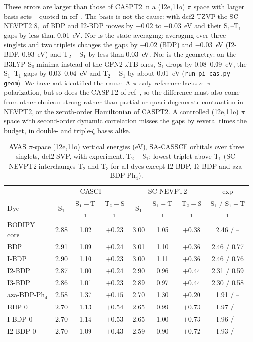 \documentclass[journal=jctcce,manuscript=article]{achemso}
\begin{document}
These errors are larger than those of CASPT2 in a (12e,11o) $\pi$ space with larger basis
sets~\cite{Momeni2015}, quoted in ref~. The basis is not the cause: with def2-TZVP the
SC-NEVPT2 S$_1$ of BDP and I2-BDP moves by $-0.02$ to $-0.03$~eV and their S$_1$--T$_1$ gaps by less than
0.01~eV. Nor is the state
averaging: averaging over three singlets and two triplets changes the gaps by $-0.02$ (BDP) and $-0.03$~eV
(I2-BDP, 0.93~eV) and T$_2-$S$_1$ by less than 0.03~eV. Nor is the geometry: on the B3LYP S$_0$ minima instead of the GFN2-xTB
ones, S$_1$ drops by 0.08--0.09~eV, the S$_1$--T$_1$ gaps by 0.03--0.04~eV and T$_2-$S$_1$ by about 0.01~eV
(\texttt{run\_pi\_cas.py --geom}). We have not identified the cause. A $\pi$-only reference lacks $\sigma$--$\pi$ polarization, but so does
the CASPT2 of ref~, so the difference must also come from other choices: strong rather than partial or quasi-degenerate contraction in NEVPT2, or the zeroth-order Hamiltonian of CASPT2.
A controlled (12e,11o) $\pi$ space with second-order dynamic correlation misses
the gaps by several times the budget, in double- and triple-$\zeta$ bases alike.

\begin{table}
  \caption{AVAS $\pi$-space (12e,11o) vertical energies (eV), SA-CASSCF orbitals over three singlets,
  def2-SVP, with experiment. T$_2-$S$_1$: lowest triplet above T$_1$ (SC-NEVPT2 interchanges T$_2$ and T$_3$
  for all dyes except I2-BDP, I3-BDP and aza-BDP-Ph$_4$).}
  \label{tab:pi}
  \begin{tabular}{lccccccc}
    \toprule
    & \multicolumn{3}{c}{CASCI} & \multicolumn{3}{c}{SC-NEVPT2} & exp \\
    Dye & S$_1$ & S$_1-$T$_1$ & T$_2-$S$_1$ & S$_1$ & S$_1-$T$_1$ & T$_2-$S$_1$ & S$_1$ / S$_1-$T$_1$ \\
    \midrule
    BODIPY core & 2.88 & 1.02 & $+0.23$ & 3.00 & 1.05 & $+0.38$ & 2.46 / -- \\
    BDP         & 2.91 & 1.09 & $+0.24$ & 3.01 & 1.10 & $+0.36$ & 2.46 / 0.77 \\
    I-BDP       & 2.90 & 1.10 & $+0.23$ & 3.00 & 1.11 & $+0.36$ & 2.46 / 0.76 \\
    I2-BDP      & 2.87 & 1.00 & $+0.24$ & 2.90 & 0.96 & $+0.44$ & 2.31 / 0.59 \\
    I3-BDP      & 2.86 & 1.01 & $+0.23$ & 2.89 & 0.97 & $+0.44$ & 2.30 / 0.58 \\
    aza-BDP-Ph$_4$ & 2.58 & 1.37 & $+0.15$ & 2.70 & 1.30 & $+0.20$ & 1.91 / -- \\
    BDP-0       & 2.70 & 1.13 & $+0.54$ & 2.65 & 0.99 & $+0.73$ & 1.97 / -- \\
    I-BDP-0     & 2.70 & 1.14 & $+0.53$ & 2.65 & 1.00 & $+0.73$ & 1.96 / -- \\
    I2-BDP-0    & 2.70 & 1.09 & $+0.43$ & 2.59 & 0.90 & $+0.72$ & 1.93 / -- \\
    \bottomrule
  \end{tabular}
\end{table}
\end{document}
